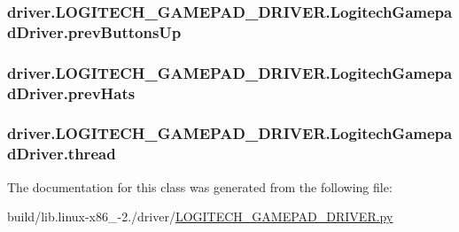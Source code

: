 \subsubsection[{prev\+Buttons\+Up}]{\setlength{\rightskip}{0pt plus 5cm}driver.\+L\+O\+G\+I\+T\+E\+C\+H\+\_\+\+G\+A\+M\+E\+P\+A\+D\+\_\+\+D\+R\+I\+V\+E\+R.\+Logitech\+Gamepad\+Driver.\+prev\+Buttons\+Up}\label{classdriver_1_1LOGITECH__GAMEPAD__DRIVER_1_1LogitechGamepadDriver_ae1e571536fd2c9e2d1c8fe9c26faf679}
\hypertarget{classdriver_1_1LOGITECH__GAMEPAD__DRIVER_1_1LogitechGamepadDriver_aa8da5cd73f609421083322375f6f5299}{}
\subsubsection[{prev\+Hats}]{\setlength{\rightskip}{0pt plus 5cm}driver.\+L\+O\+G\+I\+T\+E\+C\+H\+\_\+\+G\+A\+M\+E\+P\+A\+D\+\_\+\+D\+R\+I\+V\+E\+R.\+Logitech\+Gamepad\+Driver.\+prev\+Hats}\label{classdriver_1_1LOGITECH__GAMEPAD__DRIVER_1_1LogitechGamepadDriver_aa8da5cd73f609421083322375f6f5299}
\hypertarget{classdriver_1_1LOGITECH__GAMEPAD__DRIVER_1_1LogitechGamepadDriver_a1d2fc0513bb62f3db14e1b346146690c}{}
\subsubsection[{thread}]{\setlength{\rightskip}{0pt plus 5cm}driver.\+L\+O\+G\+I\+T\+E\+C\+H\+\_\+\+G\+A\+M\+E\+P\+A\+D\+\_\+\+D\+R\+I\+V\+E\+R.\+Logitech\+Gamepad\+Driver.\+thread}\label{classdriver_1_1LOGITECH__GAMEPAD__DRIVER_1_1LogitechGamepadDriver_a1d2fc0513bb62f3db14e1b346146690c}


The documentation for this class was generated from the following file\+:\begin{DoxyCompactItemize}
\item 
build/lib.\+linux-\/x86\+\_-\/2./driver/\hyperlink{build_2lib_8linux-x86__64-2_87_2driver_2LOGITECH__GAMEPAD__DRIVER_8py}{L\+O\+G\+I\+T\+E\+C\+H\+\_\+\+G\+A\+M\+E\+P\+A\+D\+\_\+\+D\+R\+I\+V\+E\+R.\+py}\end{DoxyCompactItemize}
